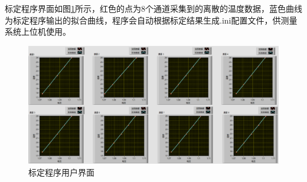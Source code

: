 标定程序界面如图\ref{fig:标定程序用户界面}所示，红色的点为8个通道采集到的离散的温度数据，蓝色曲线为标定程序输出的拟合曲线，程序会自动根据标定结果生成.ini配置文件，供测量系统上位机使用。
\begin{figure}[htb]
    \centering
    \includegraphics[width=12cm]{fig/3-fig/标定程序前面板.jpg}
    \caption{标定程序用户界面}
    \label{fig:标定程序用户界面}
\end{figure}